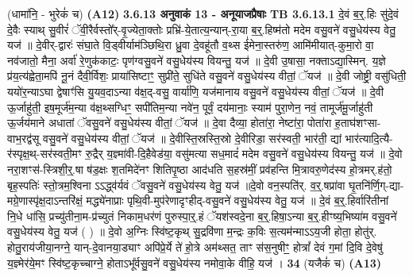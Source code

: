 \documentclass[17pt]{extarticle}
\begin{document}
{{{{{{{{{{{{{{{{{{{                  \newline
                                    (धामा॑नि॒ - भुरेकं॑ च) \textbf{(A12)} \newline \newline
                \textbf{ 3.6.13    अनुवाकं   13 - अनूयाजप्रैषाः} \newline
                                \textbf{ TB 3.6.13.1} \newline
                  दे॒वं ब॒र्॒.हिः सु॑दे॒वं दे॒वैः स्याथ् सु॒वीरं॑ ॅवी॒रैर्वस्तो᳚र्-वृ॒ज्येता॒क्तोः प्रभ्रि॑-ये॒तात्य॒न्यान्-रा॒या ब॒र्॒.हिष्म॑तो मदेम वसु॒वने॑ वसु॒धेय॑स्य वेतु॒ यज॑ ॥ दे॒वीर्-द्वारः॑ संघा॒ते वि॒ड्वीर्याम॑ञ्छिथि॒रा ध्रु॒वा दे॒वहू॑तौ व॒थ्स ई॑मेना॒स्तरु॑ण॒ आमि॑मीयात्-कुमा॒रो वा॒ नव॑जातो॒ मैना॒ अर्वा॑ रे॒णुक॑काटः॒ पृण॑ग्वसु॒वने॑ वसु॒धेय॑स्य वियन्तु॒ यज॑ ॥ दे॒वी उ॒षासा॒ नक्ताऽद्या॒स्मिन्. य॒ज्ञे प्र॑य॒त्य॑ह्वेता॒मपि॑ नू॒नं दैवी॒र्विशः॒ प्राया॑सिष्टाꣳ॒॒ सुप्री॑ते॒ सुधि॑ते वसु॒वने॑ वसु॒धेय॑स्य वीतां॒ ॅयज॑ ॥ दे॒वी जोष्ट्री॒ वसु॑धिती॒ ययो॑र॒न्याऽघा द्वेषाꣳ॑सि यु॒यव॒दाऽन्या व॑क्ष॒द्-वसु॒ वार्या॑णि॒ यज॑मानाय वसु॒वने॑ वसु॒धेय॑स्य वीतां॒ ॅयज॑ ॥ दे॒वी ऊ॒र्जाहु॑ती॒ इष॒मूर्ज॑म॒न्या व॑क्ष॒थ्सग्धिꣳ॒॒ सपी॑तिम॒न्या नवे॑न॒ पूर्वं॒ दय॑मानाः॒ स्याम॑ पुरा॒णेन॒ नवं॒ तामूर्ज॑मू॒र्जाहु॑ती ऊ॒र्जय॑माने अधातां ॅवसु॒वने॑ वसु॒धेय॑स्य वीतां॒ ॅयज॑ ॥ दे॒वा दैव्या॒ होता॑रा॒ नेष्टा॑रा॒ पोता॑रा ह॒ताघ॑शꣳसा-वाभ॒रद्व॑सू वसु॒वने॑ वसु॒धेय॑स्य वीतां॒ ॅयज॑ ॥ दे॒वीस्ति॒स्रस्ति॒स्रो दे॒वीरिडा॒ सर॑स्वती॒ भार॑ती॒ द्यां भार॑त्यादि॒त्यै-र॑स्पृक्ष॒थ्-सर॑स्वती॒मꣳ रु॒द्रैर् य॒ज्ञ्मा॑वी-दि॒हैवेड॑या॒ वसु॑मत्या सध॒मादं॑ मदेम वसु॒वने॑ वसु॒धेय॑स्य वियन्तु॒ यज॑ ॥ दे॒वो नरा॒शꣳस॑-स्त्रिशी॒र्॒.षा ष॑ड॒क्षः श॒तमिदे॑नꣳ शितिपृ॒ष्ठा आद॑धति स॒हस्र॑मीं॒ प्रव॑हन्ति मि॒त्रावरु॒णेद॑स्य हो॒त्रमर्.ह॑तो॒ बृह॒स्पतिः॑ स्तो॒त्रम॒श्विना ऽऽद्ध्व॑र्यवं ॅवसु॒वने॑ वसु॒धेय॑स्य वेतु॒ यज॑ ॥दे॒वो वन॒स्पति॑र्. व॒र्॒.षप्रा॑वा घृ॒तनि॑र्णि॒ग्-द्या-मग्रे॒णास्पृ॑क्ष॒दाऽन्तरि॑क्षं॒ मद्ध्ये॑नाप्राः पृथि॒वी-मुप॑रेणादृꣳहीद्-वसु॒वने॑ वसु॒धेय॑स्य वेतु॒ यज॑ ॥ दे॒वं ब॒र्॒.हिर्वारि॑तीनां नि॒धे धा॑सि॒ प्रच्यु॑तीना॒म-प्र॑च्युतं निकाम॒धर॑णं पुरुस्पा॒र्॒.हं ॅयश॑स्वदे॒ना ब॒र्॒.हिषा॒ऽन्या ब॒र्॒.हीꣳष्य॒भिष्या॑म वसु॒वने॑ वसु॒धेय॑स्य वेतु॒ यज॑ ( ) ॥ दे॒वो अ॒ग्निः स्वि॑ष्ट॒कृथ् सु॒द्रवि॑णा म॒न्द्रः क॒विः स॒त्यम॑न्माऽऽय॒जी होता॒ होतु॑र्. होतु॒राय॑जीया॒नग्ने॒ यान्-दे॒वानया॒ड्याꣳ अपि॑प्रे॒र्ये ते॑ हो॒त्रे अम॑थ्सत॒ ताꣳ स॑स॒नुषीꣳ॒॒ होत्रां᳚ देवं ग॒मां दि॒वि दे॒वेषु॑ य॒ज्ञ्मेर॑ये॒मꣳ स्वि॑ष्ट॒कृच्चाग्ने॒ होताऽभू᳚र्वसु॒वने॑ वसु॒धेय॑स्य नमोवा॒के वीहि॒ यज॑ । \textbf{ 34} \newline
                  \newline
                                    (यजैकं॑ च) \textbf{(A13)} \newline \newline
}}}}}}}}}}}}}}}}}}}
\end{document}
